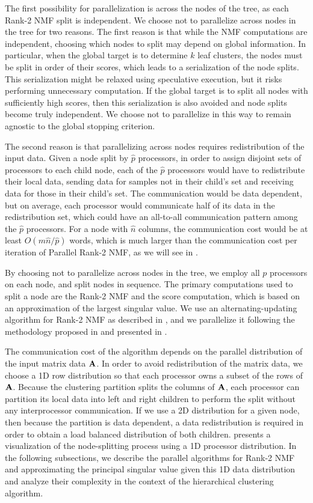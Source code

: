 \documentclass[conference,compsoc]{IEEEtran}
\begin{document}
The first possibility for parallelization is across the nodes of the tree, as each Rank-2 NMF split is independent.
We choose not to parallelize across nodes in the tree for two reasons.
The first reason is that while the NMF computations are independent, choosing which nodes to split may depend on global information.
In particular, when the global target is to determine $k$ leaf clusters, the nodes must be split in order of their scores, which leads to a serialization of the node splits.
This serialization might be relaxed using speculative execution, but it risks performing unnecessary computation.
If the global target is to split all nodes with sufficiently high scores, then this serialization is also avoided and node splits become truly independent.
We choose not to parallelize in this way to remain agnostic to the global stopping criterion.

The second reason is that parallelizing across nodes requires redistribution of the input data.
Given a node split by $\hat p$ processors, in order to assign disjoint sets of processors to each child node, each of the $\hat p$ processors would have to redistribute their local data, sending data for samples not in their child's set and receiving data for those in their child's set.
The communication would be data dependent, but on average, each processor would communicate half of its data in the redistribution set, which could have an all-to-all communication pattern among the $\hat p$ processors.
For a node with $\hat n$ columns, the communication cost would be at least $O(m\hat n/ \hat p)$ words, which is much larger than the communication cost per iteration of Parallel Rank-2 NMF, as we will see in .

By choosing not to parallelize across nodes in the tree, we employ all $p$ processors on each node, and split nodes in sequence.
The primary computations used to split a node are the Rank-2 NMF and the score computation, which is based on an approximation of the largest singular value.
We use an alternating-updating algorithm for Rank-2 NMF as described in , and we parallelize it following the methodology proposed in \cite{EH+19-TR} and presented in .

The communication cost of the algorithm depends on the parallel distribution of the input matrix data $\M{A}$.
In order to avoid redistribution of the matrix data, we choose a 1D row distribution so that each processor owns a subset of the rows of $\M{A}$.
Because the clustering partition splits the columns of $\M{A}$, each processor can partition its local data into left and right children to perform the split without any interprocessor communication.
If we use a 2D distribution for a given node, then because the partition is data dependent, a data redistribution is required in order to obtain a load balanced distribution of both children.
 presents a visualization of the node-splitting process using a 1D processor distribution.
In the following subsections, we describe the parallel algorithms for Rank-2 NMF and approximating the principal singular value given this 1D data distribution and analyze their complexity in the context of the hierarchical clustering algorithm.
\end{document}
